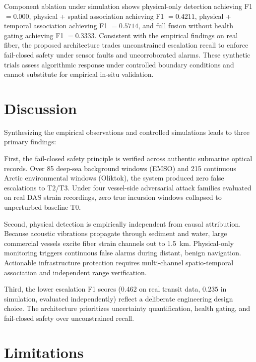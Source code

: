 \documentclass[conference]{IEEEtran}
\newcommand{\dstate}[1]{\ensuremath{\mathrm{#1}}}
\begin{document}
Component ablation under simulation shows physical-only detection achieving F1 $= 0.000$, physical + spatial association achieving F1 $= 0.4211$, physical + temporal association achieving F1 $= 0.5714$, and full fusion without health gating achieving F1 $= 0.3333$. Consistent with the empirical findings on real fiber, the proposed architecture trades unconstrained escalation recall to enforce fail-closed safety under sensor faults and uncorroborated alarms. These synthetic trials assess algorithmic response under controlled boundary conditions and cannot substitute for empirical in-situ validation.

\section{Discussion}

Synthesizing the empirical observations and controlled simulations leads to three primary findings:

First, the fail-closed safety principle is verified across authentic submarine optical records. Over 85 deep-sea background windows (EMSO) and 215 continuous Arctic environmental windows (Oliktok), the system produced zero false escalations to \dstate{T2}/\dstate{T3}. Under four vessel-side adversarial attack families evaluated on real DAS strain recordings, zero true incursion windows collapsed to unperturbed baseline \dstate{T0}.

Second, physical detection is empirically independent from causal attribution. Because acoustic vibrations propagate through sediment and water, large commercial vessels excite fiber strain channels out to 1.5~km. Physical-only monitoring triggers continuous false alarms during distant, benign navigation. Actionable infrastructure protection requires multi-channel spatio-temporal association and independent range verification.

Third, the lower escalation F1 scores ($0.462$ on real transit data, $0.235$ in simulation, evaluated independently) reflect a deliberate engineering design choice. The architecture prioritizes uncertainty quantification, health gating, and fail-closed safety over unconstrained recall.

\section{Limitations}
\label{sec:limitations}
\end{document}
